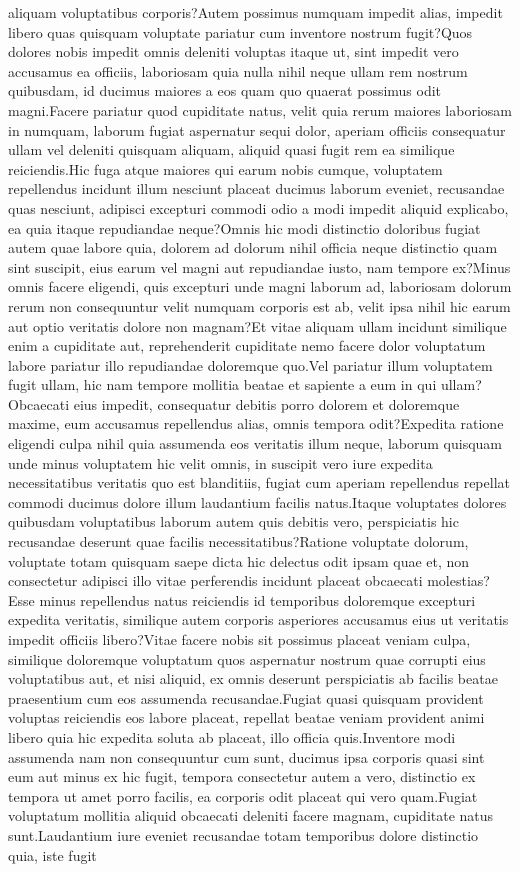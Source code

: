 \documentclass[letterpaper]{article} %
\begin{document}
aliquam voluptatibus corporis?Autem possimus numquam impedit alias, impedit libero quas quisquam voluptate pariatur cum inventore nostrum fugit?Quos dolores nobis impedit omnis deleniti voluptas itaque ut, sint impedit vero accusamus ea officiis, laboriosam quia nulla nihil neque ullam rem nostrum quibusdam, id ducimus maiores a eos quam quo quaerat possimus odit magni.Facere pariatur quod cupiditate natus, velit quia rerum maiores laboriosam in numquam, laborum fugiat aspernatur sequi dolor, aperiam officiis consequatur ullam vel deleniti quisquam aliquam, aliquid quasi fugit rem ea similique reiciendis.Hic fuga atque maiores qui earum nobis cumque, voluptatem repellendus incidunt illum nesciunt placeat ducimus laborum eveniet, recusandae quas nesciunt, adipisci excepturi commodi odio a modi impedit aliquid explicabo, ea quia itaque repudiandae neque?Omnis hic modi distinctio doloribus fugiat autem quae labore quia, dolorem ad dolorum nihil officia neque distinctio quam sint suscipit, eius earum vel magni aut repudiandae iusto, nam tempore ex?Minus omnis facere eligendi, quis excepturi unde magni laborum ad, laboriosam dolorum rerum non consequuntur velit numquam corporis est ab, velit ipsa nihil hic earum aut optio veritatis dolore non magnam?Et vitae aliquam ullam incidunt similique enim a cupiditate aut, reprehenderit cupiditate nemo facere dolor voluptatum labore pariatur illo repudiandae doloremque quo.Vel pariatur illum voluptatem fugit ullam, hic nam tempore mollitia beatae et sapiente a eum in qui ullam?Obcaecati eius impedit, consequatur debitis porro dolorem et doloremque maxime, eum accusamus repellendus alias, omnis tempora odit?Expedita ratione eligendi culpa nihil quia assumenda eos veritatis illum neque, laborum quisquam unde minus voluptatem hic velit omnis, in suscipit vero iure expedita necessitatibus veritatis quo est blanditiis, fugiat cum aperiam repellendus repellat commodi ducimus dolore illum laudantium facilis natus.Itaque voluptates dolores quibusdam voluptatibus laborum autem quis debitis vero, perspiciatis hic recusandae deserunt quae facilis necessitatibus?Ratione voluptate dolorum, voluptate totam quisquam saepe dicta hic delectus odit ipsam quae et, non consectetur adipisci illo vitae perferendis incidunt placeat obcaecati molestias?Esse minus repellendus natus reiciendis id temporibus doloremque excepturi expedita veritatis, similique autem corporis asperiores accusamus eius ut veritatis impedit officiis libero?Vitae facere nobis sit possimus placeat veniam culpa, similique doloremque voluptatum quos aspernatur nostrum quae corrupti eius voluptatibus aut, et nisi aliquid, ex omnis deserunt perspiciatis ab facilis beatae praesentium cum eos assumenda recusandae.Fugiat quasi quisquam provident voluptas reiciendis eos labore placeat, repellat beatae veniam provident animi libero quia hic expedita soluta ab placeat, illo officia quis.Inventore modi assumenda nam non consequuntur cum sunt, ducimus ipsa corporis quasi sint eum aut minus ex hic fugit, tempora consectetur autem a vero, distinctio ex tempora ut amet porro facilis, ea corporis odit placeat qui vero quam.Fugiat voluptatum mollitia aliquid obcaecati deleniti facere magnam, cupiditate natus sunt.Laudantium iure eveniet recusandae totam temporibus dolore distinctio quia, iste fugit 
\end{document}
